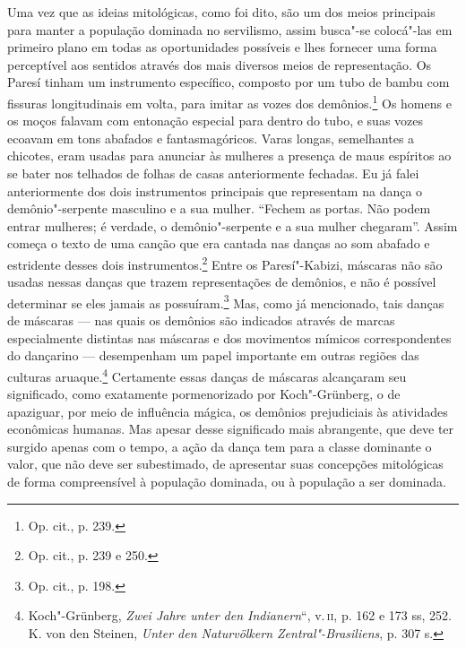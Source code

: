 Uma vez que as ideias mitológicas, como foi dito, são um dos meios
principais para manter a população dominada no servilismo, assim
busca"-se colocá"-las em primeiro plano em todas as oportunidades
possíveis e lhes fornecer uma forma perceptível aos sentidos através dos
mais diversos meios de representação. Os Paresí tinham um instrumento
específico, composto por um tubo de bambu com fissuras longitudinais em
volta, para imitar as vozes dos demônios.\footnote{Op. cit., p. 239.} Os
homens e os moços falavam com entonação especial para dentro do tubo, e
suas vozes ecoavam em tons abafados e fantasmagóricos. Varas longas,
semelhantes a chicotes, eram usadas para anunciar às mulheres a presença
de maus espíritos ao se bater nos telhados de folhas de casas
anteriormente fechadas. Eu já falei anteriormente dos dois instrumentos
principais que representam na dança o demônio"-serpente masculino e a sua
mulher. ``Fechem as portas. Não podem entrar mulheres; é verdade, o
demônio"-serpente e a sua mulher chegaram''. Assim começa o texto de uma
canção que era cantada nas danças ao som abafado e estridente desses
dois instrumentos.\footnote{Op. cit., p. 239 e 250.} Entre os
Paresí"-Kabizi, máscaras não são usadas nessas danças que trazem
representações de demônios, e não é possível determinar se eles jamais
as possuíram.\footnote{Op. cit., p. 198.} Mas, como já mencionado, tais
danças de máscaras --- nas quais os demônios são indicados através de
marcas especialmente distintas nas máscaras e dos movimentos mímicos
correspondentes do dançarino --- desempenham um papel importante em
outras regiões das culturas aruaque.\footnote{Koch"-Grünberg, \emph{Zwei
  Jahre unter den Indianern}``, v.\,\textsc{ii}, p. 162 e 173 ss, 252. K. von den
  Steinen, \emph{Unter den Naturvölkern Zentral"-Brasiliens}, p. 307 s.}
Certamente essas danças de máscaras alcançaram seu significado, como
exatamente pormenorizado por Koch"-Grünberg, o de apaziguar, por meio de
influência mágica, os demônios prejudiciais às atividades econômicas
humanas. Mas apesar desse significado mais abrangente, que deve ter
surgido apenas com o tempo, a ação da dança tem para a classe dominante
o valor, que não deve ser subestimado, de apresentar suas concepções
mitológicas de forma compreensível à população dominada, ou à
população a ser dominada.

